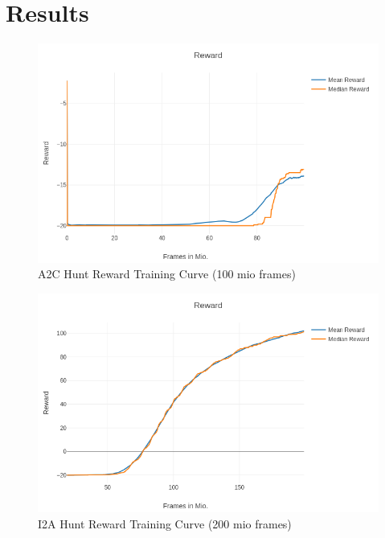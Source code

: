 \section{Results}

	
\begin{figure}[H] 
  \centering   
  \includegraphics[width=0.9\columnwidth]{./Images/a2c_hunt_reward.png}
  \caption{A2C Hunt Reward Training Curve (100 mio frames)} 
  \label{fig:environment_model_architecture} 
\end{figure} 


\begin{figure}[H] 
  \centering   
  \includegraphics[width=0.9\columnwidth]{./Images/i2a_hunt_reward_mean_and_median.png}
  \caption{I2A Hunt Reward Training Curve (200 mio frames)} 
  \label{fig:environment_model_architecture} 
\end{figure} 
